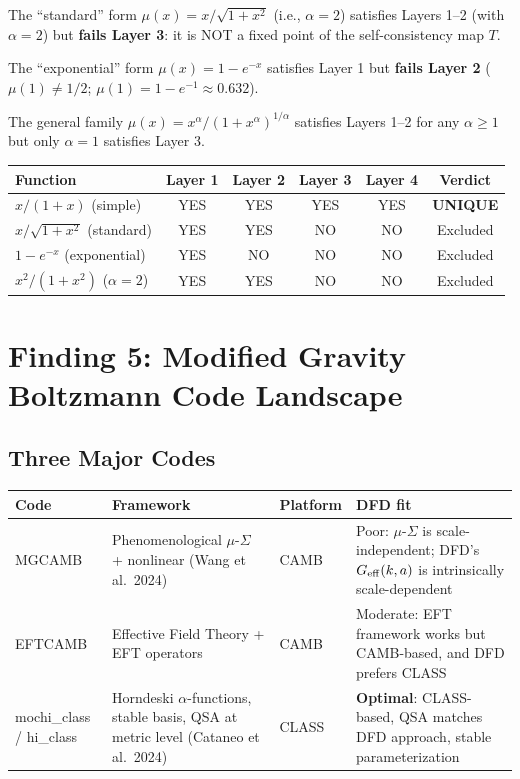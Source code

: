 \documentclass[11pt]{article}
\theoremstyle{definition}
\theoremstyle{remark}
\newcommand{\Geff}{G_{\rm eff}}
\begin{document}
The ``standard'' form $\mu(x) = x/\sqrt{1+x^2}$ (i.e., $\alpha = 2$)
satisfies Layers 1--2 (with $\alpha = 2$) but \textbf{fails Layer 3}:
it is NOT a fixed point of the self-consistency map $T$.

The ``exponential'' form $\mu(x) = 1 - e^{-x}$ satisfies Layer 1 but
\textbf{fails Layer 2} ($\mu(1) \neq 1/2$; $\mu(1) = 1 - e^{-1} \approx 0.632$).

The general family $\mu(x) = x^\alpha/(1+x^\alpha)^{1/\alpha}$
satisfies Layers 1--2 for any $\alpha \geq 1$ but only $\alpha = 1$
satisfies Layer 3.

\begin{center}
\begin{tabular}{lccccc}
\toprule
Function & Layer 1 & Layer 2 & Layer 3 & Layer 4 & \textbf{Verdict} \\
\midrule
$x/(1+x)$ (simple) & YES & YES & YES & YES & \textbf{UNIQUE} \\
$x/\sqrt{1+x^2}$ (standard) & YES & YES & NO & NO & Excluded \\
$1-e^{-x}$ (exponential) & YES & NO & NO & NO & Excluded \\
$x^2/(1+x^2)$ ($\alpha=2$) & YES & YES & NO & NO & Excluded \\
\bottomrule
\end{tabular}
\end{center}

\section{Finding 5: Modified Gravity Boltzmann Code Landscape}
\label{sec:codes}

\subsection{Three Major Codes}

\begin{center}
\begin{tabular}{p{2.5cm}p{3.5cm}p{3cm}p{3cm}}
\toprule
\textbf{Code} & \textbf{Framework} & \textbf{Platform} & \textbf{DFD fit} \\
\midrule
MGCAMB & Phenomenological $\mu$-$\Sigma$ + nonlinear
  (Wang et al.\ 2024) & CAMB & Poor: $\mu$-$\Sigma$ is
  scale-independent; DFD's $\Geff(k,a)$ is intrinsically
  scale-dependent \\
\addlinespace
EFTCAMB & Effective Field Theory + EFT operators
  & CAMB & Moderate: EFT framework works but CAMB-based,
  and DFD prefers CLASS \\
\addlinespace
mochi\_class / hi\_class & Horndeski $\alpha$-functions,
  stable basis, QSA at metric level (Cataneo et al.\ 2024)
  & CLASS & \textbf{Optimal}: CLASS-based, QSA matches DFD
  approach, stable parameterization \\
\bottomrule
\end{tabular}
\end{center}
\end{document}
